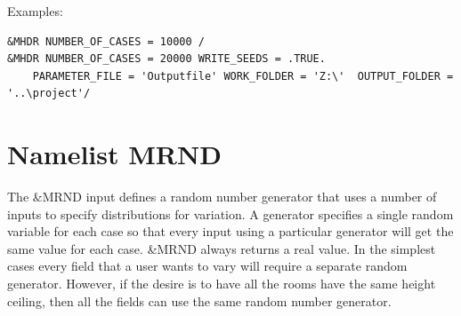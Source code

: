\documentclass[12pt,twoside]{book}
\begin{document}
\vspace{\baselineskip}
\noindent Examples:
\begin{lstlisting}[basicstyle=\scriptsize]
&MHDR NUMBER_OF_CASES = 10000 /
&MHDR NUMBER_OF_CASES = 20000 WRITE_SEEDS = .TRUE.
	PARAMETER_FILE = 'Outputfile' WORK_FOLDER = 'Z:\'  OUTPUT_FOLDER = '..\project'/
\end{lstlisting}



\section{Namelist MRND}
\label{info:MRND}

The {\ct \&MRND} input defines a random number generator that uses a number of inputs to specify distributions for variation. A generator specifies a single random variable for each case so that every input using a particular generator will get the same value for each case. {\ct \&MRND} always returns a real value. In the simplest cases every field that a user wants to vary will require a separate random generator. However, if the desire is to have all the rooms have the same height ceiling, then all the fields can use the same random number generator.
\end{document}
